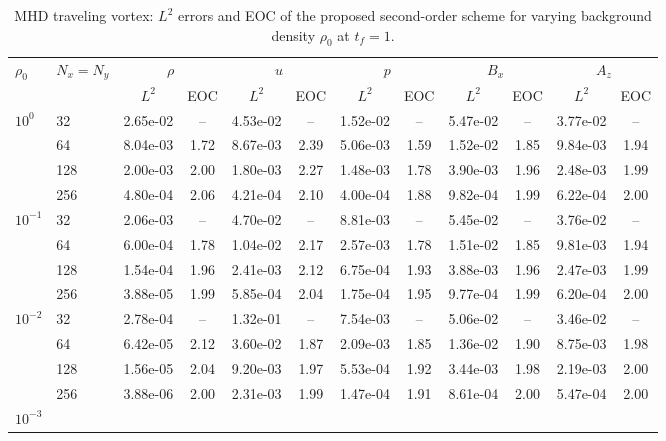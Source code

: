 \documentclass[a4paper,fleqn]{cas-sc}
\theoremstyle{definition}
\theoremstyle{remark}
\begin{document}
\begin{table}[t]
\centering
\footnotesize
\setlength{\tabcolsep}{4pt}
\caption{MHD traveling vortex: $L^2$ errors and EOC of the proposed second-order
scheme for varying background density $\rho_0$ at $t_f=1$.}
\label{tab:vortex_eoc}
\begin{tabular}{ll cc cc cc cc cc}
\toprule
$\rho_0$ & $N_x{=}N_y$
 & \multicolumn{2}{c}{$\rho$}
 & \multicolumn{2}{c}{$u$}
 & \multicolumn{2}{c}{$p$}
 & \multicolumn{2}{c}{$B_x$}
 & \multicolumn{2}{c}{$A_z$} \\
 & & $L^2$ & EOC & $L^2$ & EOC & $L^2$ & EOC & $L^2$ & EOC & $L^2$ & EOC \\
\midrule
\multirow[t]{4}{*}{$10^{0}$}
 & 32  & 2.65e-02 & --   & 4.53e-02 & --   & 1.52e-02 & --   & 5.47e-02 & --   & 3.77e-02 & --   \\
 & 64  & 8.04e-03 & 1.72 & 8.67e-03 & 2.39 & 5.06e-03 & 1.59 & 1.52e-02 & 1.85 & 9.84e-03 & 1.94 \\
 & 128 & 2.00e-03 & 2.00 & 1.80e-03 & 2.27 & 1.48e-03 & 1.78 & 3.90e-03 & 1.96 & 2.48e-03 & 1.99 \\
 & 256 & 4.80e-04 & 2.06 & 4.21e-04 & 2.10 & 4.00e-04 & 1.88 & 9.82e-04 & 1.99 & 6.22e-04 & 2.00 \\
\multirow[t]{4}{*}{$10^{-1}$}
 & 32  & 2.06e-03 & --   & 4.70e-02 & --   & 8.81e-03 & --   & 5.45e-02 & --   & 3.76e-02 & --   \\
 & 64  & 6.00e-04 & 1.78 & 1.04e-02 & 2.17 & 2.57e-03 & 1.78 & 1.51e-02 & 1.85 & 9.81e-03 & 1.94 \\
 & 128 & 1.54e-04 & 1.96 & 2.41e-03 & 2.12 & 6.75e-04 & 1.93 & 3.88e-03 & 1.96 & 2.47e-03 & 1.99 \\
 & 256 & 3.88e-05 & 1.99 & 5.85e-04 & 2.04 & 1.75e-04 & 1.95 & 9.77e-04 & 1.99 & 6.20e-04 & 2.00 \\
\multirow[t]{4}{*}{$10^{-2}$}
 & 32  & 2.78e-04 & --   & 1.32e-01 & --   & 7.54e-03 & --   & 5.06e-02 & --   & 3.46e-02 & --   \\
 & 64  & 6.42e-05 & 2.12 & 3.60e-02 & 1.87 & 2.09e-03 & 1.85 & 1.36e-02 & 1.90 & 8.75e-03 & 1.98 \\
 & 128 & 1.56e-05 & 2.04 & 9.20e-03 & 1.97 & 5.53e-04 & 1.92 & 3.44e-03 & 1.98 & 2.19e-03 & 2.00 \\
 & 256 & 3.88e-06 & 2.00 & 2.31e-03 & 1.99 & 1.47e-04 & 1.91 & 8.61e-04 & 2.00 & 5.47e-04 & 2.00 \\
\multirow[t]{4}{*}{$10^{-3}$}

\end{tabular}
\end{table}
\end{document}
